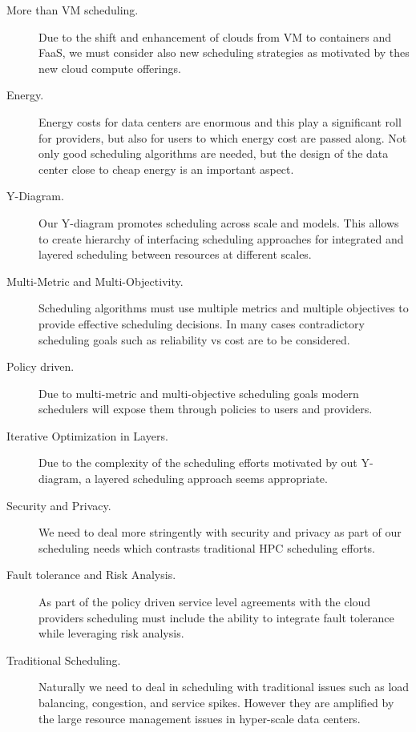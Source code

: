 \documentclass[final,5p,times,twocolumn]{elsarticle}
\begin{document}
\begin{description}

\item[More than VM scheduling.] Due to the shift and enhancement of
clouds from VM to containers and FaaS, we must consider also new
scheduling strategies as motivated by thes new cloud compute
offerings.

\item[Energy.] Energy costs for data centers are enormous and this
play a significant roll for providers, but also for users to which
energy cost are passed along. Not only good scheduling algorithms are
needed, but the design of the data center close to cheap energy is an
important aspect.

\item[Y-Diagram.] Our Y-diagram promotes scheduling across scale and
models. This allows to create hierarchy of interfacing scheduling
approaches for integrated and layered scheduling between resources at
different scales.

\item[Multi-Metric and Multi-Objectivity.] Scheduling algorithms must
use multiple metrics and multiple objectives to provide effective
scheduling decisions. In many cases contradictory scheduling goals
such as reliability vs cost are to be considered.

\item[Policy driven.] Due to multi-metric and multi-objective
scheduling goals modern schedulers will expose them through policies
to users and providers.


\item[Iterative Optimization in Layers.] Due to the complexity of the
scheduling efforts motivated by out Y-diagram, a layered scheduling
approach seems appropriate.


\item[Security and Privacy.]  We need to deal more stringently with
security and privacy as part of our scheduling needs which contrasts
traditional HPC scheduling efforts.

\item[Fault tolerance and Risk Analysis.] As part of the policy driven
service level agreements with the cloud providers scheduling must
include the ability to integrate fault tolerance while leveraging risk
analysis.

\item[Traditional Scheduling.] Naturally we need to deal in scheduling
with traditional issues such as load balancing, congestion, and
service spikes. However they are amplified by the large resource
management issues in hyper-scale data centers.



\end{description}
\end{document}
